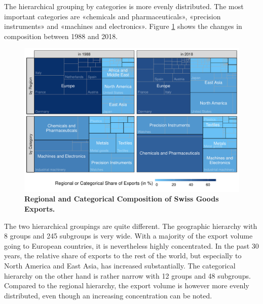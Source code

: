 \documentclass[a4paper,fleqn,11pt]{article}
\begin{document}
The hierarchical grouping by categories is more evenly distributed. The most important categories are «chemicals and pharmaceuticals», «precision instruments» and «machines and electronics». Figure \ref{fig:treemap} shows the changes in composition between 1988 and 2018.
\begin{figure}[H]
	\includegraphics[width=\textwidth]{fig/fig_treemap}
	\caption[Regional and Categorical Composition of Swiss Goods Exports]{\textbf{Regional and Categorical Composition of Swiss Goods Exports.}}\label{fig:treemap}
\end{figure}
The two hierarchical groupings are quite different. The geographic hierarchy with 8 groups and 245 subgroups is very wide.  With a majority of the export volume going to European countries, it is nevertheless highly concentrated. In the past 30 years, the relative share of exports to the rest of the world, but especially to North America and East Asia, has increased substantially. The categorical hierarchy on the other hand is rather narrow with 12 groups and 48 subgroups. Compared to the regional hierarchy, the export volume is however more evenly distributed, even though an increasing concentration can be noted.\\
\end{document}
